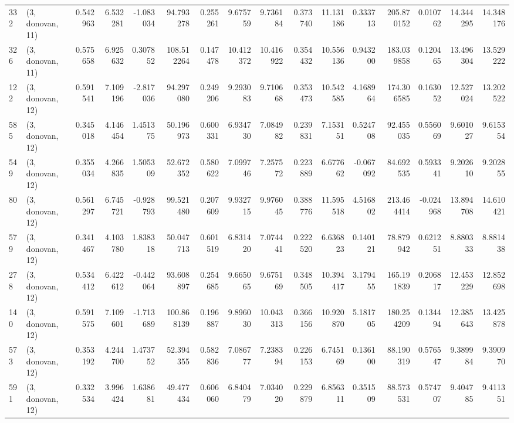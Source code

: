 \begin{tabular}{llrrrrrrrrrrrrrr}
332 &  (3, donovan, 11) &   0.542963 &   6.532281 &  -1.083034 &    94.793278 &   0.255261 &   9.675759 &   9.736184 &  0.373740 &  11.131186 &   0.333713 &   205.870152 &  0.010762 &  14.344295 &  14.348176 \\
326 &  (3, donovan, 11) &   0.575658 &   6.925632 &   0.307852 &   108.512264 &   0.147478 &  10.412372 &  10.416922 &  0.354432 &  10.556136 &   0.943200 &   183.039858 &  0.120465 &  13.496304 &  13.529222 \\
122 &  (3, donovan, 12) &   0.591541 &   7.109196 &  -2.817036 &    94.297080 &   0.249206 &   9.293083 &   9.710668 &  0.353473 &  10.542585 &   4.168964 &   174.306585 &  0.163052 &  12.527024 &  13.202522 \\
585 &  (3, donovan, 12) &   0.345018 &   4.146454 &   1.451375 &    50.196973 &   0.600331 &   6.934730 &   7.084982 &  0.239831 &   7.153151 &   0.524708 &    92.455035 &  0.556069 &   9.601027 &   9.615354 \\
549 &  (3, donovan, 12) &   0.355034 &   4.266835 &   1.505309 &    52.672352 &   0.580622 &   7.099746 &   7.257572 &  0.223889 &   6.677662 &  -0.067092 &    84.692535 &  0.593341 &   9.202610 &   9.202855 \\
80  &  (3, donovan, 12) &   0.561297 &   6.745721 &  -0.928793 &    99.521480 &   0.207609 &   9.932715 &   9.976045 &  0.388776 &  11.595518 &   4.516802 &   213.464414 & -0.024968 &  13.894708 &  14.610421 \\
579 &  (3, donovan, 12) &   0.341467 &   4.103780 &   1.838318 &    50.047713 &   0.601519 &   6.831420 &   7.074441 &  0.222520 &   6.636823 &   0.140121 &    78.879942 &  0.621251 &   8.880333 &   8.881438 \\
278 &  (3, donovan, 12) &   0.534412 &   6.422612 &  -0.442064 &    93.608897 &   0.254685 &   9.665065 &   9.675169 &  0.348505 &  10.394417 &   3.179455 &   165.191839 &  0.206817 &  12.453229 &  12.852698 \\
140 &  (3, donovan, 12) &   0.591575 &   7.109601 &  -1.713689 &   100.868139 &   0.196887 &   9.896030 &  10.043313 &  0.366156 &  10.920870 &   5.181705 &   180.254209 &  0.134494 &  12.385643 &  13.425878 \\
573 &  (3, donovan, 12) &   0.353192 &   4.244700 &   1.473752 &    52.394355 &   0.582836 &   7.086777 &   7.238394 &  0.226153 &   6.745169 &   0.136100 &    88.190319 &  0.576547 &   9.389984 &   9.390970 \\
591 &  (3, donovan, 12) &   0.332534 &   3.996424 &   1.638681 &    49.477434 &   0.606060 &   6.840479 &   7.034020 &  0.229879 &   6.856311 &   0.351509 &    88.573531 &  0.574707 &   9.404785 &   9.411351 \\

\end{tabular}
